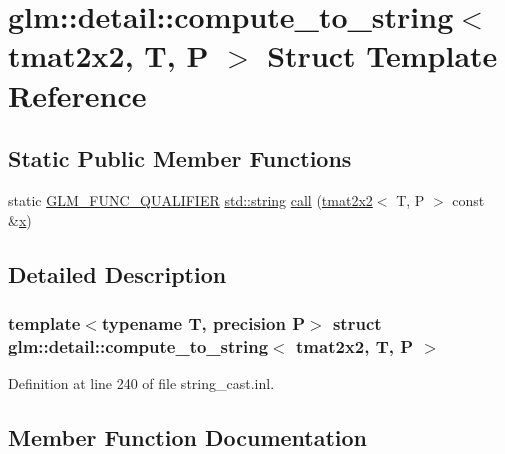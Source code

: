 \hypertarget{structglm_1_1detail_1_1compute__to__string_3_01tmat2x2_00_01_t_00_01_p_01_4}{}\section{glm\+::detail\+::compute\+\_\+to\+\_\+string$<$ tmat2x2, T, P $>$ Struct Template Reference}
\label{structglm_1_1detail_1_1compute__to__string_3_01tmat2x2_00_01_t_00_01_p_01_4}
\subsection*{Static Public Member Functions}
\begin{DoxyCompactItemize}
\item 
static \mbox{\hyperlink{setup_8hpp_a33fdea6f91c5f834105f7415e2a64407}{G\+L\+M\+\_\+\+F\+U\+N\+C\+\_\+\+Q\+U\+A\+L\+I\+F\+I\+ER}} \mbox{\hyperlink{glad_8h_ac83513893df92266f79a515488701770}{std\+::string}} \mbox{\hyperlink{structglm_1_1detail_1_1compute__to__string_3_01tmat2x2_00_01_t_00_01_p_01_4_a2e35f591c3596c78d4ad73df870dfa10}{call}} (\mbox{\hyperlink{structglm_1_1tmat2x2}{tmat2x2}}$<$ T, P $>$ const \&\mbox{\hyperlink{glad_8h_a92d0386e5c19fb81ea88c9f99644ab1d}{x}})
\end{DoxyCompactItemize}


\subsection{Detailed Description}
\subsubsection*{template$<$typename T, precision P$>$\newline
struct glm\+::detail\+::compute\+\_\+to\+\_\+string$<$ tmat2x2, T, P $>$}



Definition at line 240 of file string\+\_\+cast.\+inl.



\subsection{Member Function Documentation}
\mbox{\label{structglm_1_1detail_1_1compute__to__string_3_01tmat2x2_00_01_t_00_01_p_01_4_a2e35f591c3596c78d4ad73df870dfa10}} 
